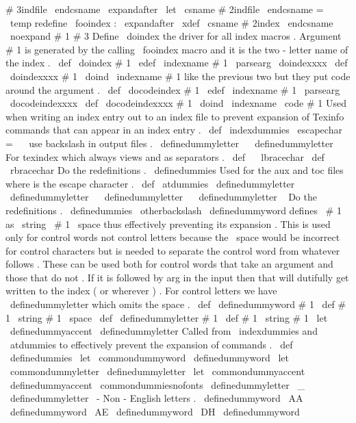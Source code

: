 {{{{{#
3indfile
\
endcsname
\
expandafter
\
let
\
csname
#
2indfile
\
endcsname
=
\
temp
%
redefine
\
fooindex
:
\
expandafter
\
xdef
\
csname
#
2index
\
endcsname
{
\
noexpand
#
1
{
#
3
}
}
%
}
%
Define
\
doindex
the
driver
for
all
index
macros
.
%
Argument
#
1
is
generated
by
the
calling
\
fooindex
macro
%
and
it
is
the
two
-
letter
name
of
the
index
.
\
def
\
doindex
#
1
{
\
edef
\
indexname
{
#
1
}
\
parsearg
\
doindexxxx
}
\
def
\
doindexxxx
#
1
{
\
doind
{
\
indexname
}
{
#
1
}
}
%
like
the
previous
two
but
they
put
code
around
the
argument
.
\
def
\
docodeindex
#
1
{
\
edef
\
indexname
{
#
1
}
\
parsearg
\
docodeindexxxx
}
\
def
\
docodeindexxxx
#
1
{
\
doind
{
\
indexname
}
{
\
code
{
#
1
}
}
}
%
Used
when
writing
an
index
entry
out
to
an
index
file
to
prevent
%
expansion
of
Texinfo
commands
that
can
appear
in
an
index
entry
.
%
\
def
\
indexdummies
{
%
\
escapechar
=
\
\
%
use
backslash
in
output
files
.
\
definedummyletter
\
%
\
definedummyletter
\
%
%
%
For
texindex
which
always
views
{
and
}
as
separators
.
\
def
\
{
{
\
lbracechar
{
}
}
%
\
def
\
}
{
\
rbracechar
{
}
}
%
%
%
Do
the
redefinitions
.
\
definedummies
}
%
Used
for
the
aux
and
toc
files
where
is
the
escape
character
.
%
\
def
\
atdummies
{
%
\
definedummyletter
\
%
\
definedummyletter
\
%
\
definedummyletter
\
{
%
\
definedummyletter
\
}
%
%
%
Do
the
redefinitions
.
\
definedummies
\
otherbackslash
}
%
\
definedummyword
defines
\
#
1
as
\
string
\
#
1
\
space
thus
effectively
%
preventing
its
expansion
.
This
is
used
only
for
control
words
%
not
control
letters
because
the
\
space
would
be
incorrect
for
%
control
characters
but
is
needed
to
separate
the
control
word
%
from
whatever
follows
.
%
%
These
can
be
used
both
for
control
words
that
take
an
argument
and
%
those
that
do
not
.
If
it
is
followed
by
{
arg
}
in
the
input
then
%
that
will
dutifully
get
written
to
the
index
(
or
wherever
)
.
%
%
For
control
letters
we
have
\
definedummyletter
which
omits
the
%
space
.
%
\
def
\
definedummyword
#
1
{
\
def
#
1
{
\
string
#
1
\
space
}
}
%
\
def
\
definedummyletter
#
1
{
\
def
#
1
{
\
string
#
1
}
}
%
\
let
\
definedummyaccent
\
definedummyletter
%
Called
from
\
indexdummies
and
\
atdummies
to
effectively
prevent
%
the
expansion
of
commands
.
%
\
def
\
definedummies
{
%
%
\
let
\
commondummyword
\
definedummyword
\
let
\
commondummyletter
\
definedummyletter
\
let
\
commondummyaccent
\
definedummyaccent
\
commondummiesnofonts
%
\
definedummyletter
\
_
%
\
definedummyletter
\
-
%
%
%
Non
-
English
letters
.
\
definedummyword
\
AA
\
definedummyword
\
AE
\
definedummyword
\
DH
\
definedummyword
}}}}}
